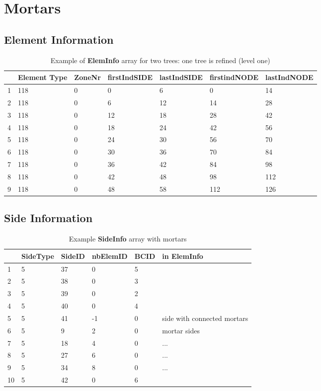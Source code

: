 \documentclass[a4paper,headsepline]{scrreprt}
\begin{document}
\section{Mortars}

\subsection{Element Information}

\begin{table}[h!]
\centering
\begin{tabular}{|l|l|l|l|l|l|l|} \hline
  & Element Type & ZoneNr & firstIndSIDE & lastIndSIDE & firstindNODE & lastIndNODE \\ \hline
1 & 118 & 0 & 0 & 6 & 0 & 14 \\ \hline
2 & 118 & 0 & 6 & 12 & 14 & 28 \\ \hline
3 & 118 & 0 & 12 & 18 & 28 & 42 \\ \hline
4 & 118 & 0 & 18 & 24 & 42 & 56 \\ \hline
5 & 118 & 0 & 24 & 30 & 56 & 70 \\ \hline
6 & 118 & 0 & 30 & 36 & 70 & 84 \\ \hline
7 & 118 & 0 & 36 & 42 & 84 & 98 \\ \hline
8 & 118 & 0 & 42 & 48 & 98 & 112 \\ \hline
9 & 118 & 0 & 48 & 58 & 112 & 126 \\ \hline
\end{tabular}
\caption{Example of \textbf{ElemInfo} array for two trees: one tree is refined (level one)}
\end{table}

\newpage

\subsection{Side Information}

\begin{table}[h!]
\centering
\begin{tabular}{|l|l|l|l|l|l|}
\hline
 & SideType & SideID & nbElemID & BCID & in \textbf{ElemInfo}\\ \hline
1 & 5 & 37 & 0 & 5 &  \\ \hline
2 & 5 & 38 & 0 & 3 &  \\ \hline
3 & 5 & 39 & 0 & 2 &  \\ \hline
4 & 5 & 40 & 0 & 4 &  \\ \hline
5 & 5 & 41 & -1 & 0 &  side with connected mortars \\ \hline
6 & 5 & 9 & 2 & 0 &  mortar sides\\ \hline
7 & 5 & 18 & 4 & 0 &  ...\\ \hline
8 & 5 & 27 & 6 & 0 &  ...\\ \hline
9 & 5 & 34 & 8 & 0 &  ...\\ \hline
10 & 5 & 42 & 0 & 6 &  \\ \hline
\end{tabular}
\caption{Example \textbf{SideInfo} array with mortars}
\end{table}
\end{document}
